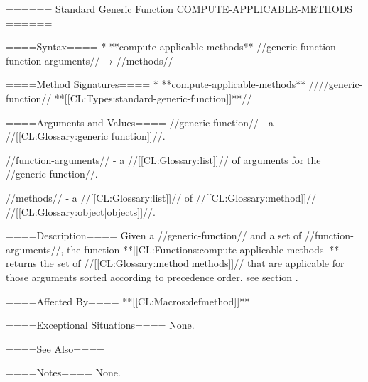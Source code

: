 ====== Standard Generic Function COMPUTE-APPLICABLE-METHODS ======

====Syntax====
  * **compute-applicable-methods** //generic-function function-arguments// → //methods//

====Method Signatures====
  * **compute-applicable-methods** ////generic-function// **[[CL:Types:standard-generic-function]]**//

====Arguments and Values====
//generic-function// - a //[[CL:Glossary:generic function]]//.

//function-arguments// - a //[[CL:Glossary:list]]// of arguments for the //generic-function//.

//methods// - a //[[CL:Glossary:list]]// of //[[CL:Glossary:method]]// //[[CL:Glossary:object|objects]]//.

====Description====
Given a //generic-function// and a set of //function-arguments//, the function **[[CL:Functions:compute-applicable-methods]]** returns the set of //[[CL:Glossary:method|methods]]// that are applicable for those arguments sorted according to precedence order. see section {\secref\MethodSelectionAndCombination}.

====Affected By====
**[[CL:Macros:defmethod]]**

====Exceptional Situations====
None.

====See Also====
{\secref\MethodSelectionAndCombination}

====Notes====
None.

